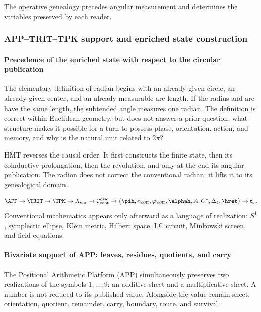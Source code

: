 \noindent The operative genealogy precedes angular measurement and determines the variables preserved by each reader.\par\medskip

\subsubsection{APP--TRIT--TPK support and enriched state construction}

\paragraph{Precedence of the enriched state with respect to the circular publication}

The elementary definition of radian begins with an already given circle, an already
given center, and an already measurable arc length. If the radius and arc have the
same length, the subtended angle measures one radian. The definition is correct
within Euclidean geometry, but does not answer a prior question:
what structure makes it possible for a turn to possess phase, orientation, action, and
memory, and why is the natural unit related to \(2\pi\)?

HMT reverses the causal order. It first constructs the finite state, then its
coinductive prolongation, then the revolution, and only at the end its angular
publication. The radion does not correct the conventional radian; it lifts it to its
genealogical domain.

\begin{typebox}
\[
\APP\to\TRIT\to\TPK\to X_{\mathrm{enr}}
\to\mathcal C^{\mathrm{disc}}_{\mathrm{cont}}
\to\bigl(\pih,e_{\HMT},\varphi_{\HMT},\alphah,A,C^*,\Delta_4,\hret\bigr)
\to\mathfrak r_\sigma.
\]
Conventional mathematics appears only afterward as a language of realization:
\(S^1\), symplectic ellipse, Klein metric, Hilbert space, LC
circuit, Minkowski screen, and field equations.
\end{typebox}

\paragraph{Bivariate support of APP: leaves, residues, quotients, and carry}

The Positional Arithmetic Platform (APP) simultaneously preserves two
realizations of the symbols \(1,\dots,9\): an additive sheet and a
multiplicative sheet. A number is not reduced to its published value. Alongside the value
remain sheet, orientation, quotient, remainder, carry, boundary, route, and
survival.

